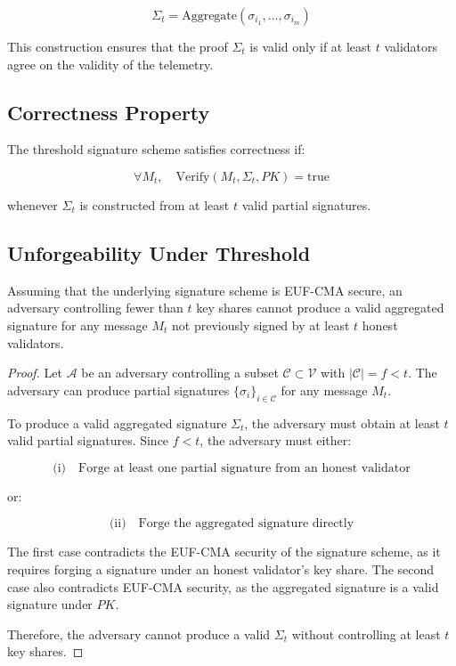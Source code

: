 \begin{equation}
\Sigma_t = \text{Aggregate}(\sigma_{i_1}, \dots, \sigma_{i_m})
\end{equation}

This construction ensures that the proof $\Sigma_t$ is valid only if at least $t$ validators agree on the validity of the telemetry.

\subsection{Correctness Property}

The threshold signature scheme satisfies correctness if:

\begin{equation}
\forall M_t, \quad \text{Verify}(M_t, \Sigma_t, PK) = \text{true}
\end{equation}

whenever $\Sigma_t$ is constructed from at least $t$ valid partial signatures.

\subsection{Unforgeability Under Threshold}

\begin{theorem}
Assuming that the underlying signature scheme is EUF-CMA secure, an adversary controlling fewer than $t$ key shares cannot produce a valid aggregated signature for any message $M_t$ not previously signed by at least $t$ honest validators.
\end{theorem}

\begin{proof}
Let $\mathcal{A}$ be an adversary controlling a subset $\mathcal{C} \subset \mathcal{V}$ with $|\mathcal{C}| = f < t$. The adversary can produce partial signatures $\{\sigma_i\}_{i \in \mathcal{C}}$ for any message $M_t$.

To produce a valid aggregated signature $\Sigma_t$, the adversary must obtain at least $t$ valid partial signatures. Since $f < t$, the adversary must either:

\begin{equation}
\text{(i)} \quad \text{Forge at least one partial signature from an honest validator}
\end{equation}

or:

\begin{equation}
\text{(ii)} \quad \text{Forge the aggregated signature directly}
\end{equation}

The first case contradicts the EUF-CMA security of the signature scheme, as it requires forging a signature under an honest validator's key share. The second case also contradicts EUF-CMA security, as the aggregated signature is a valid signature under $PK$.

Therefore, the adversary cannot produce a valid $\Sigma_t$ without controlling at least $t$ key shares.
\end{proof}

